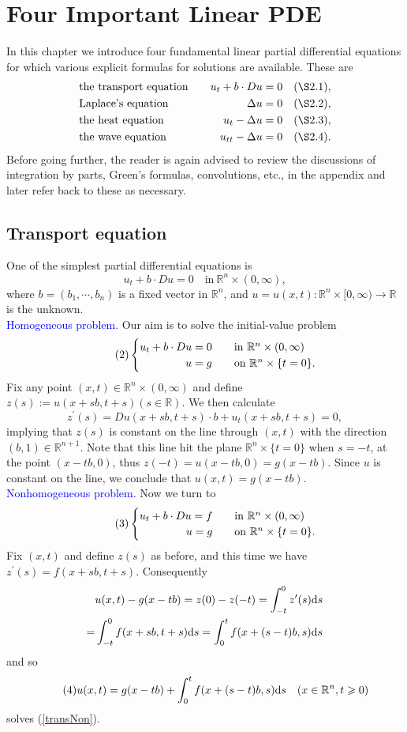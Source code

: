 \documentclass[hyperref,UTF8,12pt]{article}
\numberwithin{equation}{subsection}
\theoremstyle{plain}
\theoremstyle{definition}
\numberwithin{theorem}{section}
\numberwithin{lemma}{section}
\numberwithin{proposition}{section}
\numberwithin{remark}{section}
\numberwithin{corollary}{section}
\numberwithin{definition}{section}
\numberwithin{problem}{section}
\numberwithin{example}{section}
\def\dif{\textup{d}}
\newcommand{\mr}{\mathbb{R}}
\renewcommand{\geq}{\geqslant}
\begin{document}
\newpage
\section{Four Important Linear PDE}
In this chapter we introduce four fundamental linear partial differential equations for which various explicit formulas for solutions are available. These are
\[\begin{aligned}
	&\text{the transport equation}\quad &u_t+b\cdot Du=0\quad &(\S 2.1),\\
	&\text{Laplace's equation}\quad &\Delta u=0\quad &(\S 2.2),\\
	&\text{the heat equation}\quad &u_t-\Delta u=0\quad &(\S 2.3),\\
	&\text{the wave equation}\quad &u_{tt}-\Delta u=0\quad &(\S 2.4).
\end{aligned}\]
Before going further, the reader is again advised to review the discussions of integration by parts, Green's formulas, convolutions, etc., in the appendix and later refer back to these as necessary.

\subsection{Transport equation}
One of the simplest partial differential equations is{\color{red}\[u_t+b\cdot Du=0\quad\text{in}~\mr^n\times(0,\infty),\tag{1}\]}where $b=(b_1,\cdots,b_n)$ is a fixed vector in $\mr^n$, and $u=u(x,t):\mr^n\times[0,\infty)\to\mr$ is the unknown.\\
\textcolor{blue}{Homogeneous problem.} Our aim is to solve the initial-value problem\[\tag{2}\begin{cases}
	\hfill u_t+b\cdot Du=0\quad&\text{in}~\mr^n\times(0,\infty)\\
	\hfill u=g\quad&\text{on}~\mr^n\times\{t=0\}.
\end{cases}\] Fix any point $(x,t)\in\mr^n\times(0,\infty)$ and define $z(s):=u(x+sb,t+s)(s\in\mr)$. We then calculate \[z^\prime(s)=Du(x+sb,t+s)\cdot b+u_t(x+sb,t+s)=0,\]implying that $z(s)$ is constant on the line through $(x,t)$ with the direction $(b,1)\in\mr^{n+1}$. Note that this line hit the plane $\mr^n\times\{t=0\}$ when $s=-t$, at the point $(x-tb,0)$, thus $z(-t)=u(x-tb,0)=g(x-tb)$. Since $u$ is constant on the line, we conclude that $u(x,t)=g(x-tb)$.\\
\textcolor{blue}{Nonhomogeneous problem.} Now we turn to \[\label{transNon}\tag{3}\begin{cases}
	\hfill u_t+b\cdot Du=f\quad&\text{in}~\mr^n\times(0,\infty)\\
	\hfill u=g\quad&\text{on}~\mr^n\times\{t=0\}.
\end{cases}\]Fix $(x,t)$ and define $z(s)$ as before, and this time we have $z^\prime(s)=f(x+s b,t+s)$. Consequently\[\begin{aligned}
&u(x,t)-g(x-tb)=z(0)-z(-t)=\int_{-t}^0z^\prime(s)\dif s \\
=&\int_{-t}^0f(x+sb,t+s)\dif s=\int_0^tf(x+(s-t)b,s)\dif s
\end{aligned}\]and so\[\tag{4}u(x,t)=g(x-tb)+\int_0^tf(x+(s-t)b,s)\dif s\quad(x\in\mr^n,t\geq0)\]solves (\ref{transNon}).
\end{document}
